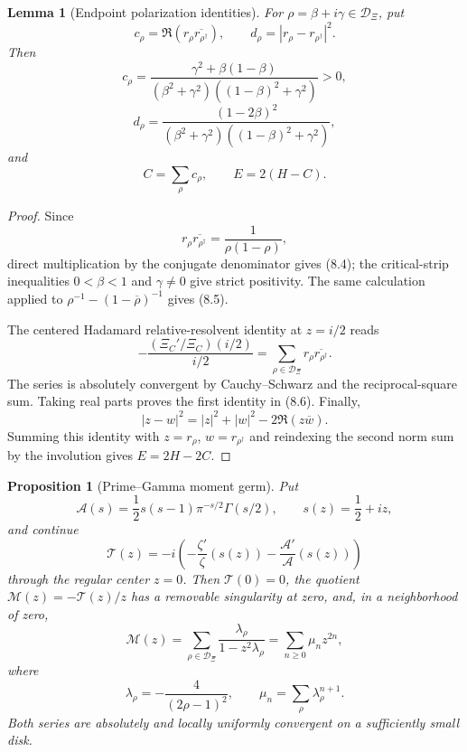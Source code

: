 \documentclass[11pt]{article}
\newtheorem{proposition}[theorem]{Proposition}
\newtheorem{lemma}[theorem]{Lemma}
\begin{document}
\begin{lemma}[Endpoint polarization identities]
\label{lem:endpoint-polarization}
For $\rho=\beta+i\gamma\in\mathcal D_\Xi$, put
\[
 c_\rho=\Re\!\left(r_\rho\overline{r_{\rho^\dagger}}\right),\qquad
 d_\rho=|r_\rho-r_{\rho^\dagger}|^2.
\]
Then
\[
 c_\rho=
 \frac{\gamma^2+\beta(1-\beta)}
 {(\beta^2+\gamma^2)((1-\beta)^2+\gamma^2)}>0,
 \tag{8.4}
\]
\[
 d_\rho=
 \frac{(1-2\beta)^2}
 {(\beta^2+\gamma^2)((1-\beta)^2+\gamma^2)},
 \tag{8.5}
\]
and
\[
 C=\sum_\rho c_\rho,\qquad E=2(H-C).
 \tag{8.6}
\]
\end{lemma}

\begin{proof}
Since
\[
 r_\rho\overline{r_{\rho^\dagger}}
 =\frac1{\rho(1-\rho)},
\]
direct multiplication by the conjugate denominator gives \textup{(8.4)}; the critical-strip
inequalities $0<\beta<1$ and $\gamma\ne0$ give strict positivity.  The same calculation applied
to $\rho^{-1}-(1-\overline\rho)^{-1}$ gives \textup{(8.5)}.

The centered Hadamard relative-resolvent identity at $z=i/2$ reads
\[
 -\frac{(\Xi_C'/\Xi_C)(i/2)}{i/2}
 =\sum_{\rho\in\mathcal D_\Xi}
   r_\rho\overline{r_{\rho^\dagger}}.
 \tag{8.7}
\]
The series is absolutely convergent by Cauchy--Schwarz and the reciprocal-square sum.  Taking
real parts proves the first identity in \textup{(8.6)}.  Finally,
\[
 |z-w|^2=|z|^2+|w|^2-2\Re(z\overline w).
\]
Summing this identity with $z=r_\rho$, $w=r_{\rho^\dagger}$ and reindexing the second norm sum by
the involution gives $E=2H-2C$.
\end{proof}

\begin{proposition}[Prime--Gamma moment germ]
\label{prop:prime-arch-moment-germ}
Put
\[
 \mathcal A(s)=\frac12s(s-1)\pi^{-s/2}\Gamma(s/2),\qquad
 s(z)=\frac12+iz,
\]
and continue
\[
 \mathcal T(z)
 =-i\left(-\frac{\zeta'}{\zeta}(s(z))
          -\frac{\mathcal A'}{\mathcal A}(s(z))\right)
 \tag{8.7a}
\]
through the regular center $z=0$.  Then $\mathcal T(0)=0$, the quotient
$\mathcal M(z)=-\mathcal T(z)/z$ has a removable singularity at zero, and, in a neighborhood of
zero,
\[
 \mathcal M(z)
 =\sum_{\rho\in\mathcal D_\Xi}
   \frac{\lambda_\rho}{1-z^2\lambda_\rho}
 =\sum_{n\ge0}\mu_nz^{2n},
 \tag{8.7b}
\]
where
\[
 \lambda_\rho=-\frac4{(2\rho-1)^2},\qquad
 \mu_n=\sum_\rho\lambda_\rho^{n+1}.
 \tag{8.7c}
\]
Both series are absolutely and locally uniformly convergent on a sufficiently small disk.
\end{proposition}
\end{document}
